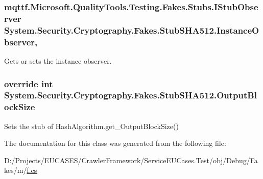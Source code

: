 \hypertarget{class_system_1_1_security_1_1_cryptography_1_1_fakes_1_1_stub_s_h_a512_a46d51e3756ecaeb9dbfb2c8e83675c12}{
\subsubsection[{Instance\-Observer}]{\setlength{\rightskip}{0pt plus 5cm}mqttf.\-Microsoft.\-Quality\-Tools.\-Testing.\-Fakes.\-Stubs.\-I\-Stub\-Observer System.\-Security.\-Cryptography.\-Fakes.\-Stub\-S\-H\-A512.\-Instance\-Observer\hspace{0.3cm}{\ttfamily [get]}, {\ttfamily [set]}}}\label{class_system_1_1_security_1_1_cryptography_1_1_fakes_1_1_stub_s_h_a512_a46d51e3756ecaeb9dbfb2c8e83675c12}


Gets or sets the instance observer.

\hypertarget{class_system_1_1_security_1_1_cryptography_1_1_fakes_1_1_stub_s_h_a512_a41461ad7cfa4e9b62a0303d1bcdd9a17}{
\subsubsection[{Output\-Block\-Size}]{\setlength{\rightskip}{0pt plus 5cm}override int System.\-Security.\-Cryptography.\-Fakes.\-Stub\-S\-H\-A512.\-Output\-Block\-Size\hspace{0.3cm}{\ttfamily [get]}}}\label{class_system_1_1_security_1_1_cryptography_1_1_fakes_1_1_stub_s_h_a512_a41461ad7cfa4e9b62a0303d1bcdd9a17}


Sets the stub of Hash\-Algorithm.\-get\-\_\-\-Output\-Block\-Size()



The documentation for this class was generated from the following file\-:\begin{DoxyCompactItemize}
\item 
D\-:/\-Projects/\-E\-U\-C\-A\-S\-E\-S/\-Crawler\-Framework/\-Service\-E\-U\-Cases.\-Test/obj/\-Debug/\-Fakes/m/\hyperlink{m_2f_8cs}{f.\-cs}\end{DoxyCompactItemize}
